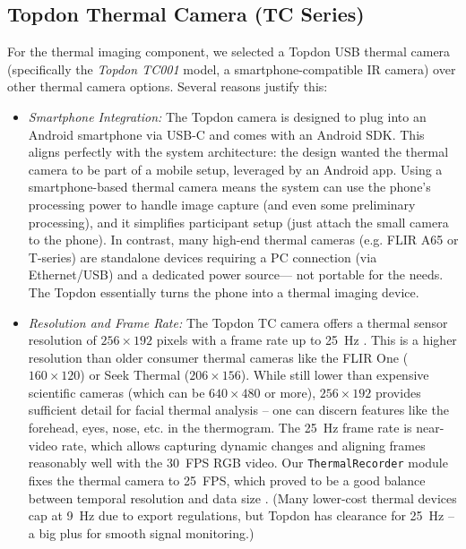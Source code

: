 \documentclass{report}
\begin{document}
    \subsection*{Topdon Thermal Camera (TC Series)}
    For the thermal imaging component, we selected a Topdon USB thermal camera (specifically the \textit{Topdon TC001} model, a smartphone-compatible IR camera) over other thermal camera options. Several reasons justify this:
    \begin{itemize}
        \item \textit{Smartphone Integration:} The Topdon camera is designed to plug into an Android smartphone via USB-C and comes with an Android SDK. This aligns perfectly with the system architecture: the design wanted the thermal camera to be part of a mobile setup, leveraged by an Android app. Using a smartphone-based thermal camera means the system can use the phone's processing power to handle image capture (and even some preliminary processing), and it simplifies participant setup (just attach the small camera to the phone). In contrast, many high-end thermal cameras (e.g. FLIR A65 or T-series) are standalone devices requiring a PC connection (via Ethernet/USB) and a dedicated power source--- not portable for the needs. The Topdon essentially turns the phone into a thermal imaging device.

        \item \textit{Resolution and Frame Rate:} The Topdon TC camera offers a thermal sensor resolution of $256 \times 192$ pixels with a frame rate up to 25~Hz \cite{topdon20}. This is a higher resolution than older consumer thermal cameras like the FLIR One ($160 \times 120$) or Seek Thermal ($206 \times 156$). While still lower than expensive scientific cameras (which can be $640 \times 480$ or more), $256 \times 192$ provides sufficient detail for facial thermal analysis -- one can discern features like the forehead, eyes, nose, etc. in the thermogram. The 25~Hz frame rate is near-video rate, which allows capturing dynamic changes and aligning frames reasonably well with the 30~FPS RGB video. Our \texttt{ThermalRecorder} module fixes the thermal camera to 25~FPS, which proved to be a good balance between temporal resolution and data size \cite{topdon20}. (Many lower-cost thermal devices cap at 9~Hz due to export regulations, but Topdon has clearance for 25~Hz -- a big plus for smooth signal monitoring.)


\end{itemize}
\end{document}
